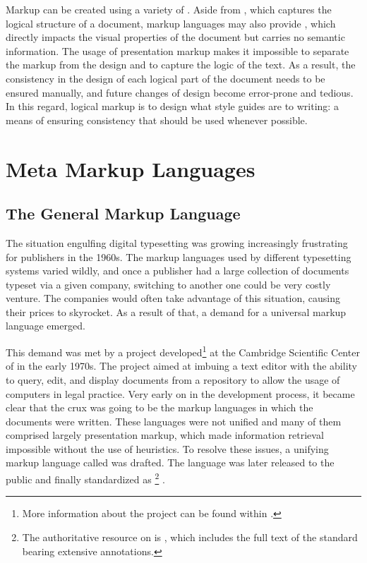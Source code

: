 \documentclass{book}
\begin{document}
Markup can be created using a variety of . Aside from
, which captures the logical structure of a document,
markup languages may also provide , which directly
impacts the visual properties of the document but carries no semantic
information. The usage of presentation markup makes it impossible to separate
the markup from the design and to capture the logic of the text. As a result,
the consistency in the design of each logical part of the document needs to be
ensured manually, and future changes of design become error-prone and tedious.
In this regard, logical markup is to design what style guides are to writing: a
means of ensuring consistency that should be used whenever possible.

\section{Meta Markup Languages}
\subsection{The General Markup Language}
The situation engulfing digital typesetting was growing increasingly frustrating
for publishers in the 1960s. The markup languages used by different typesetting
systems varied wildly, and once a publisher had a large collection of documents
typeset via a given company, switching to another one could be very costly
venture. The companies would often take advantage of this situation, causing
their prices to skyrocket. As a result of that, a demand for a universal markup
language emerged.

This demand was met by a project developed\footnote{
  More information about the project can be found within
  \textcite{goldfarb96,goldfarb97:whySGML}.
} at the Cambridge Scientific Center of  in the early 1970s. The
project aimed at imbuing a text editor with the ability to query, edit, and
display documents from a repository to allow the usage of computers in legal
practice. Very early on in the development process, it became clear that the
crux was going to be the markup languages in which the documents were written.
These languages were not unified and many of them comprised largely presentation
markup, which made information retrieval impossible without the use of
heuristics. To resolve these issues, a unifying markup language called
 was drafted. The language was later released \citeyear{goldfarb81}
to the public \cite{goldfarb81} and finally standardized \citeyear{iso86} as
\footnote{
  The authoritative resource on  is \textcite{goldfarb91}, which
  includes the full text of the standard bearing extensive annotations.
} \cite{iso86}.
\end{document}
